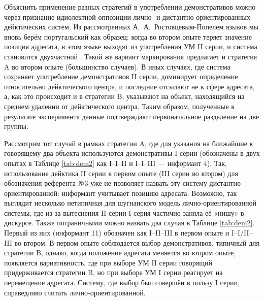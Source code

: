 Объяснить применение разных стратегий в употреблении демонстративов можно через признание идиолектной оппозиции лично- и дистантно-ориентированных дейктических систем. Из рассмотренных А.~А.~Ростовцевым-Попелем языков мы вновь берём португальский как образец: когда во втором опыте теряет значение позиция адресата, в этом языке выходят из употребления УМ II серии, и система становится двухчастной \parencite[28–29]{popiel2009}. Такой же вариант маркирования предлагает и стратегия A во втором опыте (большинство случаев). В иных случаях, где система сохраняет употребление демонстративов II серии, доминирует определение относительно дейктического центра, и последние отсылают не к сфере адресата, а, как это происходит и в стратегии B, указывают на объект, находящийся на среднем удалении от дейктического центра. Таким образом, полученные в результате эксперимента данные подтверждают первоначальное разделение на две группы.

Рассмотрим тот случай в рамках стратегии A, где для указания на ближайшие к говорящему два объекта используются демонстративы I серии (обозначены в двух опытах в Таблице \ref{tab:dem2} как I–I–II и I–I–III — информант 4). Так, использование дейктика II серии в первом опыте (III серии во втором) для обозначения референта №3 уже не позволяет назвать эту систему дистантно-ориентированной: информант учитывает позицию адресата. Возможно, так выглядит несколько нетипичная для шугнанского модель лично-ориентированной системы, где из-за вытеснения II серии I серия частично заняла её «нишу» в дискурсе. Также пограничными можно назвать два случая в Таблице \ref{tab:dem2}. Первый из них (информант 11) обозначен как I–II–III в первом опыте и I–I/II–III во втором. В первом опыте соблюдается выбор демонстративов, типичный для стратегии B, однако, когда положение адресата меняется во втором опыте, появляется вариативность, где при выборе УМ II серии говорящий придерживается стратегии B, но при выборе УМ I серии реагирует на перемещение адресата. Систему, где выбор был совершён в пользу I серии, справедливо считать лично-ориентированной.

